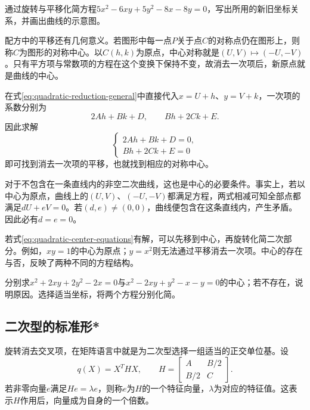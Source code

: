 \begin{example}\label{ex:quadratic-reduce-ellipse}
通过旋转与平移化简方程\(5x^2-6xy+5y^2-8x-8y=0\)，写出所用的新旧坐标关系，并画出曲线的示意图。
\end{example}

配方中的平移还有几何意义。若图形中每一点\(P\)关于点\(C\)的对称点仍在图形上，则称\(C\)为图形的{\heiti{}对称中心}。以\(C(h,k)\)为原点，中心对称就是\((U,V)\mapsto(-U,-V)\)。只有平方项与常数项的方程在这个变换下保持不变，故消去一次项后，新原点就是曲线的中心。

在式\eqref{eq:quadratic-reduction-general}中直接代入\(x=U+h\)、\(y=V+k\)，一次项的系数分别为
\begin{equation*}
    2Ah+Bk+D , \qquad Bh+2Ck+E .
\end{equation*}
因此求解
\begin{equation}\label{eq:quadratic-center-equations}
    \begin{cases}
        2Ah+Bk+D=0 ,\\
        Bh+2Ck+E=0
    \end{cases}
\end{equation}
即可找到消去一次项的平移，也就找到相应的对称中心。

对于不包含在一条直线内的非空二次曲线，这也是中心的必要条件。事实上，若以中心为原点，曲线上的\((U,V)\)、\((-U,-V)\)都满足方程，两式相减可知全部点都满足\(dU+eV=0\)。若\((d,e)\ne(0,0)\)，曲线便包含在这条直线内，产生矛盾。因此必有\(d=e=0\)。

若式\eqref{eq:quadratic-center-equations}有解，可以先移到中心，再旋转化简二次部分。例如，\(xy=1\)的中心为原点；\(y=x^2\)则无法通过平移消去一次项。中心的存在与否，反映了两种不同的方程结构。

\begin{example}
分别求\(x^2+2xy+2y^2-2x=0\)与\(x^2-2xy+y^2-x-y=0\)的中心；若不存在，说明原因。选择适当坐标，将两个方程分别化简。
\end{example}



\subsection{二次型的标准形*}
\label{subsec:quadratic-normal-form}

旋转消去交叉项，在矩阵语言中就是为二次型选择一组适当的正交单位基。设
\begin{equation*}
    q(X)=X^THX , \qquad
    H=\left[\begin{matrix}A&B/2\\B/2&C\end{matrix}\right] .
\end{equation*}
若非零向量\(e\)满足\(He=\lambda e\)，则称\(e\)为\(H\)的一个{\heiti{}特征向量}，\(\lambda\)为对应的{\heiti{}特征值}。这表示\(H\)作用后，向量成为自身的一个倍数。

